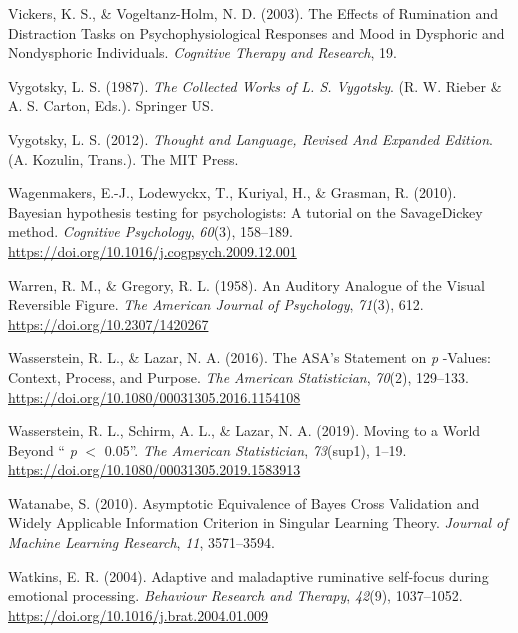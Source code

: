 \documentclass[a4paper,12pt,twoside,openright,oldfontcommands]{memoir}
\begin{document}
\leavevmode\hypertarget{ref-vickers_effects_2003}{}%
Vickers, K. S., \& Vogeltanz-Holm, N. D. (2003). The Effects of Rumination and Distraction Tasks on Psychophysiological Responses and Mood in Dysphoric and Nondysphoric Individuals. \emph{Cognitive Therapy and Research}, 19.

\leavevmode\hypertarget{ref-vygotsky_collected_1987}{}%
Vygotsky, L. S. (1987). \emph{The Collected Works of L. S. Vygotsky}. (R. W. Rieber \& A. S. Carton, Eds.). Springer US.

\leavevmode\hypertarget{ref-vygotsky_thought_2012}{}%
Vygotsky, L. S. (2012). \emph{Thought and Language, Revised And Expanded Edition}. (A. Kozulin, Trans.). The MIT Press.

\leavevmode\hypertarget{ref-wagenmakers_bayesian_2010}{}%
Wagenmakers, E.-J., Lodewyckx, T., Kuriyal, H., \& Grasman, R. (2010). Bayesian hypothesis testing for psychologists: A tutorial on the SavageDickey method. \emph{Cognitive Psychology}, \emph{60}(3), 158--189. \url{https://doi.org/10.1016/j.cogpsych.2009.12.001}

\leavevmode\hypertarget{ref-warren_auditory_1958}{}%
Warren, R. M., \& Gregory, R. L. (1958). An Auditory Analogue of the Visual Reversible Figure. \emph{The American Journal of Psychology}, \emph{71}(3), 612. \url{https://doi.org/10.2307/1420267}

\leavevmode\hypertarget{ref-wasserstein_asas_2016}{}%
Wasserstein, R. L., \& Lazar, N. A. (2016). The ASA's Statement on \emph{p} -Values: Context, Process, and Purpose. \emph{The American Statistician}, \emph{70}(2), 129--133. \url{https://doi.org/10.1080/00031305.2016.1154108}

\leavevmode\hypertarget{ref-wasserstein_moving_2019}{}%
Wasserstein, R. L., Schirm, A. L., \& Lazar, N. A. (2019). Moving to a World Beyond `` \emph{p} \(<\) 0.05''. \emph{The American Statistician}, \emph{73}(sup1), 1--19. \url{https://doi.org/10.1080/00031305.2019.1583913}

\leavevmode\hypertarget{ref-watanabe_asymptotic_2010}{}%
Watanabe, S. (2010). Asymptotic Equivalence of Bayes Cross Validation and Widely Applicable Information Criterion in Singular Learning Theory. \emph{Journal of Machine Learning Research}, \emph{11}, 3571--3594.

\leavevmode\hypertarget{ref-watkins_adaptive_2004}{}%
Watkins, E. R. (2004). Adaptive and maladaptive ruminative self-focus during emotional processing. \emph{Behaviour Research and Therapy}, \emph{42}(9), 1037--1052. \url{https://doi.org/10.1016/j.brat.2004.01.009}
\end{document}
